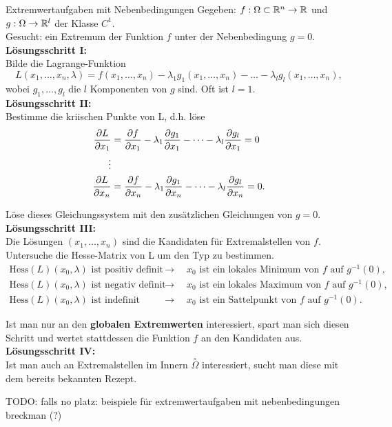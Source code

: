 \begin{Rezept}{Extremwertaufgaben mit Nebenbedingungen}{}
	Gegeben: $f:\Omega\subset \mathbb{R}^n \to \mathbb{R}$ und $g:\Omega \to \mathbb{R}^l$ der Klasse $C^1$.\\
	Gesucht: ein Extremum der Funktion $f$ unter der Nebenbedingung $g=0$.\\
	\newline
	\textbf{Lösungsschritt I:}\\
	Bilde die Lagrange-Funktion
	\begin{equation*}
	L(x_1,\dots,x_n,\lambda) = f(x_1,\dots,x_n) - \lambda_1 g_1(x_1,\dots,x_n) - \dots - \lambda_l g_l(x_1,\dots,x_n),
	\end{equation*}
	wobei $g_1,\dots,g_l$ die $l$ Komponenten von $g$ sind. Oft ist $l=1$.\\
	\newline
	\textbf{Lösungsschritt II:}\\
	Bestimme die kriischen Punkte von L, d.h. löse
	\begin{align*}
	\pdv{L}{x_1} &= \pdv{f}{x_1}-\lambda_1\pdv{g_1}{x_1} - \dots -\lambda_l\pdv{g_l}{x_1} = 0\\
	\vdots\\
	\pdv{L}{x_n} &= \pdv{f}{x_n}-\lambda_1\pdv{g_1}{x_n} - \dots -\lambda_l\pdv{g_l}{x_n} = 0.
	\end{align*}
	
	Löse dieses Gleichungssystem mit den zusätzlichen Gleichungen von $g=0$.\\
	\newline
	\textbf{Lösungsschritt III:}\\
	Die Lösungen $(x_1,\dots,x_n)$ sind die Kandidaten für Extremalstellen von $f$. Untersuche die Hesse-Matrix von L um den Typ zu bestimmen.
	\begin{align*}
	\text{Hess}(L)(x_0,\lambda)\text{ ist positiv definit} \quad &\rightarrow  \quad 
	x_0 \text{ ist ein lokales Minimum von } f \text{ auf } g^{-1}(0),\\
	\text{Hess}(L)(x_0,\lambda)\text{ ist negativ definit} \quad &\rightarrow  \quad x_0 \text{ ist ein lokales Maximum von } f \text{ auf } g^{-1}(0),\\
	\text{Hess}(L)(x_0,\lambda)\text{ ist indefinit} \quad &\rightarrow  \quad x_0 \text{ ist ein Sattelpunkt von } f \text{ auf } g^{-1}(0).
	\end{align*}
	
	Ist man nur an den \textbf{globalen Extremwerten} interessiert, spart man sich diesen Schritt und wertet stattdessen die Funktion $f$ an den Kandidaten aus.\\
	\newline
	\textbf{Lösungsschritt IV:}\\
	Ist man auch an Extremalstellen im Innern $\overset{\circ}{\Omega}$ interessiert, sucht man diese mit dem bereits bekannten Rezept.
\end{Rezept}

TODO: falls no platz: beispiele für extremwertaufgaben mit nebenbedingungen breckman (?)